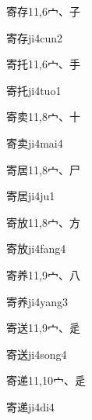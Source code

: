 \begin{entry}{寄存}{11,6}{⼧、⼦}
  \begin{phonetics}{寄存}{ji4cun2}
  \end{phonetics}
\end{entry}

\begin{entry}{寄托}{11,6}{⼧、⼿}
  \begin{phonetics}{寄托}{ji4tuo1}
  \end{phonetics}
\end{entry}

\begin{entry}{寄卖}{11,8}{⼧、⼗}
  \begin{phonetics}{寄卖}{ji4mai4}
  \end{phonetics}
\end{entry}

\begin{entry}{寄居}{11,8}{⼧、⼫}
  \begin{phonetics}{寄居}{ji4ju1}
  \end{phonetics}
\end{entry}

\begin{entry}{寄放}{11,8}{⼧、⽅}
  \begin{phonetics}{寄放}{ji4fang4}
  \end{phonetics}
\end{entry}

\begin{entry}{寄养}{11,9}{⼧、⼋}
  \begin{phonetics}{寄养}{ji4yang3}
  \end{phonetics}
\end{entry}

\begin{entry}{寄送}{11,9}{⼧、⾡}
  \begin{phonetics}{寄送}{ji4song4}
  \end{phonetics}
\end{entry}

\begin{entry}{寄递}{11,10}{⼧、⾡}
  \begin{phonetics}{寄递}{ji4di4}
  \end{phonetics}
\end{entry}

